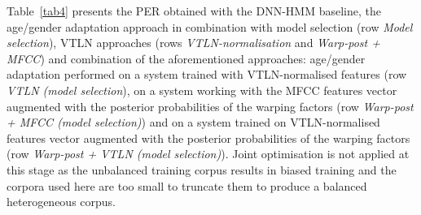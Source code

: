 \documentclass{nle}
\begin{document}

Table~\ref{tab4} presents the PER obtained with the DNN-HMM baseline, the age/gender adaptation approach in combination with model selection (row {\em Model selection}), VTLN approaches (rows {\em VTLN-normalisation} and {\em Warp-post + MFCC}) and combination of the aforementioned approaches: age/gender adaptation performed on a system trained with VTLN-normalised features (row {\em VTLN (model selection}), on a system working with the MFCC features vector augmented with the posterior probabilities of the warping factors (row {\em Warp-post + MFCC (model selection)}) and on a system trained on VTLN-normalised features vector augmented with the posterior probabilities of the warping factors (row {\em Warp-post + VTLN (model selection)}). Joint optimisation is not applied at this stage as the unbalanced training corpus results in biased training and the corpora used here are too small to truncate them to produce a balanced heterogeneous corpus. 
\end{document}
